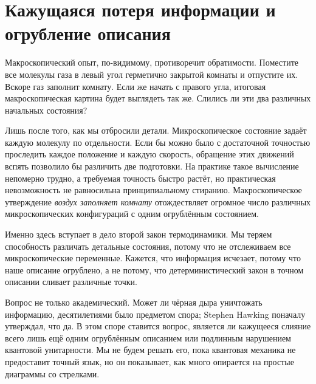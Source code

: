 \section{Кажущаяся потеря информации и огрубление описания}

Макроскопический опыт, по-видимому, противоречит обратимости. Поместите все молекулы газа в левый угол герметично закрытой комнаты и отпустите их. Вскоре газ заполнит комнату. Если же начать с правого угла, итоговая макроскопическая картина будет выглядеть так же. Слились ли эти два различных начальных состояния?

Лишь после того, как мы отбросили детали. Микроскопическое состояние задаёт каждую молекулу по отдельности. Если бы можно было с достаточной точностью проследить каждое положение и каждую скорость, обращение этих движений вспять позволило бы различить две подготовки. На практике такое вычисление непомерно трудно, а требуемая точность быстро растёт, но практическая невозможность не равносильна принципиальному стиранию. Макроскопическое утверждение \emph{воздух заполняет комнату} отождествляет огромное число различных микроскопических конфигураций с одним огрублённым состоянием.

Именно здесь вступает в дело второй закон термодинамики. Мы теряем способность различать детальные состояния, потому что не отслеживаем все микроскопические переменные. Кажется, что информация исчезает, потому что наше описание огрублено, а не потому, что детерминистический закон в точном описании сливает различные точки.

\begin{classroomqa}
\end{classroomqa}

Вопрос не только академический. Может ли чёрная дыра уничтожать информацию, десятилетиями было предметом спора; Stephen Hawking поначалу утверждал, что да. В этом споре ставится вопрос, является ли кажущееся слияние всего лишь ещё одним огрублённым описанием или подлинным нарушением квантовой унитарности. Мы не будем решать его, пока квантовая механика не предоставит точный язык, но он показывает, как много опирается на простые диаграммы со стрелками.


